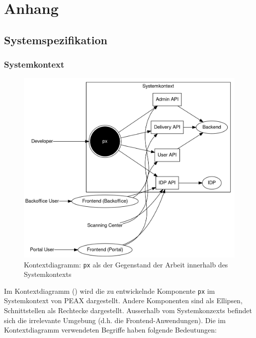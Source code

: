 \section{Anhang}

\subsection{Systemspezifikation}

\subsubsection{Systemkontext}

\begin{figure}
	\centering
	\includegraphics[width=\linewidth]{pics/kontextdiagramm.png}
	\caption{Kontextdiagramm: \texttt{px} als der Gegenstand der Arbeit innerhalb des Systemkontexts}
	\label{fig:kontextdiagramm}
\end{figure}

Im Kontextdiagramm () wird die zu entwickelnde Komponente \texttt{px} im Systemkontext von PEAX dargestellt. Andere Komponenten sind als Ellipsen, Schnittstellen als Rechtecke dargestellt. Ausserhalb vom Systemkonzexts befindet sich die irrelevante Umgebung (d.h. die Frontend-Anwendungen). Die im Kontextdiagramm verwendeten Begriffe haben folgende Bedeutungen:

